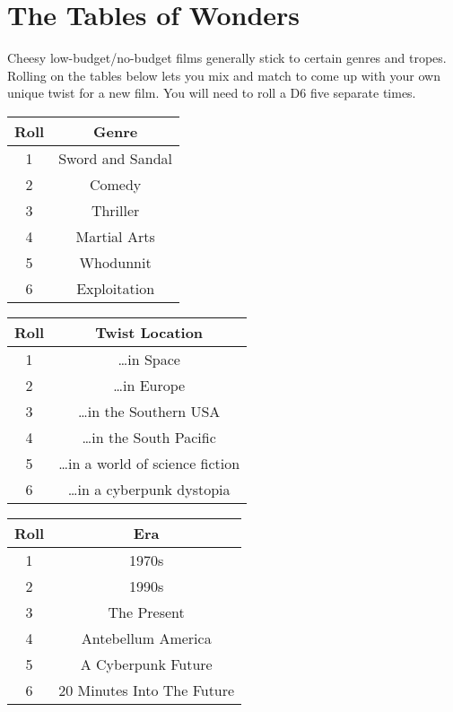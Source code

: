 \documentclass[
notumble,
a5paper
]{leaflet}
\begin{document}
\section*{The Tables of Wonders}

Cheesy low-budget/no-budget films generally stick to certain genres and tropes.  Rolling on the tables below lets you mix and match to come up with your own unique twist for a new film.  You will need to roll a D6 five separate times.

\begin{center}
\begin{tabular}{ |c|c| } 
 \hline
 Roll & Genre \\ 
 \hline
 1 & Sword and Sandal \\
 \hline
 2 & Comedy \\
 \hline
 3 & Thriller \\
 \hline
 4 & Martial Arts \\
 \hline
 5 & Whodunnit \\
 \hline
 6 & Exploitation \\
 \hline
\end{tabular}
\end{center}

\begin{center}
\begin{tabular}{ |c|c| } 
 \hline
 Roll & Twist Location \\ 
 \hline
 1 & \ldots in Space \\
 \hline
 2 & \ldots in  Europe \\
 \hline
 3 & \ldots in the Southern USA \\
 \hline
 4 & \ldots in the South Pacific \\
 \hline
 5 & \ldots in a world of science fiction \\
 \hline
 6 & \ldots in a cyberpunk dystopia \\
 \hline
\end{tabular}
\end{center}

\begin{center}
\begin{tabular}{ |c|c| } 
 \hline
 Roll & Era \\ 
 \hline
 1 & 1970s \\
 \hline
 2 & 1990s \\
 \hline
 3 & The Present \\
 \hline
 4 & Antebellum America \\
 \hline
 5 & A Cyberpunk Future \\
 \hline
 6 & 20 Minutes Into The Future \\
 \hline
\end{tabular}
\end{center}
\end{document}
